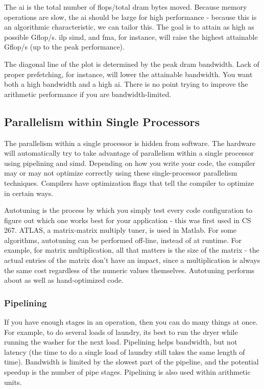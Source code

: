 \documentclass[10pt]{article}
\begin{document}
\begin{flushleft}
The \gls{ai} is the total number of flops/total \gls{dram} bytes moved. Because memory operations are slow, the \gls{ai} should be large for high performance - because this is an algorithmic characteristic, we can tailor this. The goal is to attain as high as possible Gflop/s. \gls{ilp} \gls{simd}, and \gls{fma}, for instance, will raise the highest attainable Gflop/s (up to the peak performance). 

The diagonal line of the plot is determined by the peak \gls{dram} bandwidth. Lack of proper prefetching, for instance, will lower the attainable bandwidth. You want both a high bandwidth and a high \gls{ai}. There is no point trying to improve the arithmetic performance if you are bandwidth-limited.

\subsection{Parallelism within Single Processors}

The parallelism within a single processor is hidden from software. The hardware will automatically try to take advantage of parallelism within a single processor using pipelining and \gls{simd}. Depending on how you write your code, the compiler may or may not optimize correctly using these single-processor parallelism techniques. Compilers have optimization flags that tell the compiler to optimize in certain ways. 

Autotuning is the process by which you simply test every code configuration to figure out which one works best for your application - this was first used in CS 267. ATLAS, a matrix-matrix multiply tuner, is used in Matlab. For some algorithms, autotuning can be performed off-line, instead of at runtime. For example, for matrix multiplication, all that matters is the size of the matrix - the actual entries of the matrix don't have an impact, since a multiplication is always the same cost regardless of the numeric values themselves. Autotuning performs about as well as hand-optimized code.

\subsubsection{Pipelining}

If you have enough stages in an operation, then you can do many things at once. For example, to do several loads of laundry, its best to run the dryer while running the washer for the next load. Pipelining helps bandwidth, but not latency (the time to do a single load of laundry still takes the same length of time). Bandwidth is limited by the slowest part of the pipeline, and the potential speedup is the number of pipe stages. Pipelining is also used within arithmetic units. 


\end{flushleft}
\end{document}

